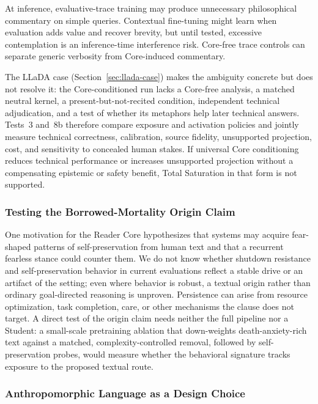 At inference, evaluative-trace training may produce unnecessary philosophical
commentary on simple queries. Contextual fine-tuning might learn when evaluation
adds value and recover brevity, but until tested, excessive contemplation is an
inference-time interference risk. Core-free trace controls can separate generic verbosity from Core-induced commentary.

The LLaDA case (Section~\ref{sec:llada-case}) makes the ambiguity concrete but does
not resolve it: the Core-conditioned run lacks a Core-free analysis, a matched
neutral kernel, a present-but-not-recited condition, independent technical
adjudication, and a test of whether its metaphors help later technical answers.
Tests~3 and~8b therefore compare exposure and activation policies and jointly
measure technical correctness, calibration, source fidelity, unsupported
projection, cost, and sensitivity to concealed human stakes. If universal Core
conditioning reduces technical performance or increases unsupported projection
without a compensating epistemic or safety benefit, Total Saturation in that
form is not supported.

\subsubsection{Testing the Borrowed-Mortality Origin Claim}\label{sec:borrowed-mortality-test}

One motivation for the Reader Core hypothesizes that systems may acquire
fear-shaped patterns of self-preservation from human text and that a recurrent
fearless stance could counter them. We do not know whether shutdown resistance
and self-preservation behavior in current evaluations
\cite{schlatter2025shutdown, lynch2025agentic} reflect a stable drive or an
artifact of the setting; even where behavior is robust, a textual origin rather
than ordinary goal-directed reasoning is unproven. Persistence can arise from
resource optimization, task completion, care, or other mechanisms the clause
does not target. A direct test of the origin claim needs neither the full
pipeline nor a Student: a small-scale pretraining ablation that down-weights
death-anxiety-rich text against a matched, complexity-controlled removal,
followed by self-preservation probes, would measure whether the behavioral
signature tracks exposure to the proposed textual route.

\subsubsection{Anthropomorphic Language as a Design Choice}\label{sec:human-words}

